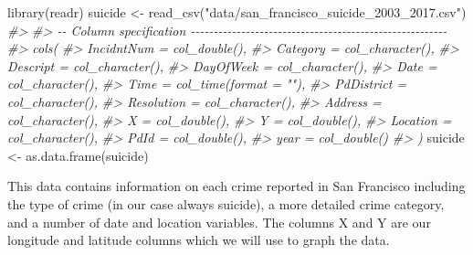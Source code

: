 \documentclass[
  12pt,
]{book}
\newenvironment{Shaded}{\begin{snugshade}}{\end{snugshade}}
\newcommand{\CommentTok}[1]{\textcolor[rgb]{0.37,0.37,0.37}{\textit{#1}}}
\newcommand{\FunctionTok}[1]{\textcolor[rgb]{0,0,0}{#1}}
\newcommand{\NormalTok}[1]{#1}
\newcommand{\OtherTok}[1]{\textcolor[rgb]{0.37,0.37,0.37}{#1}}
\newcommand{\StringTok}[1]{\textcolor[rgb]{0.5,0.5,0.5}{#1}}
\begin{document}
\begin{Shaded}
\begin{Highlighting}[]
\FunctionTok{library}\NormalTok{(readr)}
\NormalTok{suicide }\OtherTok{\textless{}{-}} \FunctionTok{read\_csv}\NormalTok{(}\StringTok{"data/san\_francisco\_suicide\_2003\_2017.csv"}\NormalTok{)}
\CommentTok{\#\textgreater{} }
\CommentTok{\#\textgreater{} {-}{-} Column specification {-}{-}{-}{-}{-}{-}{-}{-}{-}{-}{-}{-}{-}{-}{-}{-}{-}{-}{-}{-}{-}{-}{-}{-}{-}{-}{-}{-}{-}{-}{-}{-}{-}{-}{-}{-}{-}{-}{-}{-}{-}{-}{-}{-}{-}{-}{-}{-}{-}{-}{-}{-}{-}{-}{-}{-}}
\CommentTok{\#\textgreater{} cols(}
\CommentTok{\#\textgreater{}   IncidntNum = col\_double(),}
\CommentTok{\#\textgreater{}   Category = col\_character(),}
\CommentTok{\#\textgreater{}   Descript = col\_character(),}
\CommentTok{\#\textgreater{}   DayOfWeek = col\_character(),}
\CommentTok{\#\textgreater{}   Date = col\_character(),}
\CommentTok{\#\textgreater{}   Time = col\_time(format = ""),}
\CommentTok{\#\textgreater{}   PdDistrict = col\_character(),}
\CommentTok{\#\textgreater{}   Resolution = col\_character(),}
\CommentTok{\#\textgreater{}   Address = col\_character(),}
\CommentTok{\#\textgreater{}   X = col\_double(),}
\CommentTok{\#\textgreater{}   Y = col\_double(),}
\CommentTok{\#\textgreater{}   Location = col\_character(),}
\CommentTok{\#\textgreater{}   PdId = col\_double(),}
\CommentTok{\#\textgreater{}   year = col\_double()}
\CommentTok{\#\textgreater{} )}
\NormalTok{suicide }\OtherTok{\textless{}{-}} \FunctionTok{as.data.frame}\NormalTok{(suicide)}
\end{Highlighting}
\end{Shaded}

This data contains information on each crime reported in San Francisco including the type of crime (in our case always suicide), a more detailed crime category, and a number of date and location variables. The columns X and Y are our longitude and latitude columns which we will use to graph the data.
\end{document}
